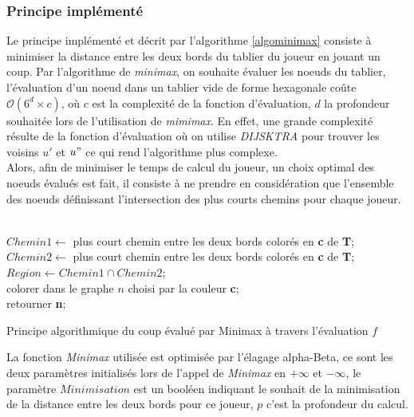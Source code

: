 \subsubsection{Principe implémenté}
Le principe implémenté et décrit par l'algorithme \ref{algominimax} consiste à minimiser la distance entre les deux bords du tablier du joueur en jouant un coup. Par l'algorithme de \textit{minimax}, on souhaite évaluer les noeuds du tablier, l'évaluation d'un noeud dans un tablier vide de forme hexagonale coûte $\mathcal{O} (6^{d}\times c) $, où $c$ est la complexité de la fonction d'évaluation, $d$ la profondeur souhaitée lors de l'utilisation de \textit{mimimax}. En effet, une grande complexité résulte de la fonction d'évaluation où on utilise \textit{DIJSKTRA} pour trouver les voisins $u'$ et $u"$ ce qui rend l'algorithme plus complexe.\\
Alors, afin de minimiser le temps de calcul du joueur, un choix optimal des noeuds évalués est fait, il consiste à ne prendre en considération que l'ensemble des noeuds définissant l'intersection des plus courts chemins pour chaque joueur.\\ \\
\begin{algorithm}[H]

$Chemin1 \leftarrow$ plus court chemin entre les deux bords colorés en \textbf{c} de \textbf{T};\\
$Chemin2 \leftarrow$ plus court chemin entre les deux bords colorés en \textbf{{c}} de \textbf{T};\\
$Region \leftarrow Chemin1 \cap Chemin2 $; \\    
colorer dans le graphe $n$ choisi par la couleur \textbf{c};\\
retourner \textbf{n};

\caption{Principe algorithmique du coup évalué par Minimax à travers l'évaluation $f$}
\label{algominimax}
\end{algorithm}


La fonction \textit{Minimax} utilisée est optimisée par l'élagage alpha-Beta, ce sont les deux paramètres initialisés lors de l'appel de \textit{Minimax} en $+\infty$ et $-\infty$, le paramètre $Minimisation$ est un booléen indiquant le souhait de la minimisation de la distance entre les deux bords pour ce joueur, $p$ c'est la profondeur du calcul.
